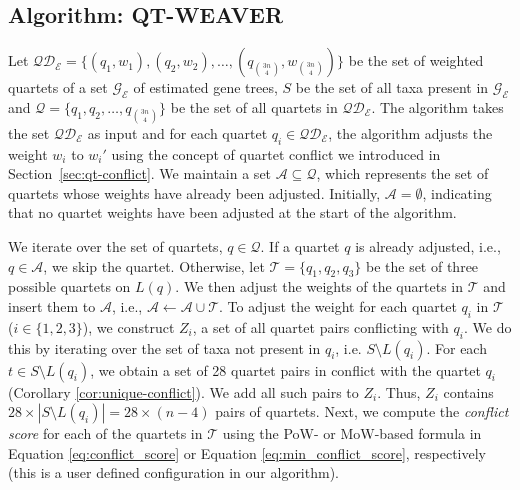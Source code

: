 \documentclass[10pt,a4paper]{article}
\newcommand{\addb}[1]{{\color{red} #1}}
\begin{document}
\subsection{Algorithm: QT-WEAVER}
\label{sec:qt-weaver-algorithm}

Let $\mathcal{QD_E} = \{ (q_1,w_1), (q_2,w_2), \ldots, (q_{3n \choose 4},w_{3n \choose 4}) \}$ be the set of weighted quartets of a set $\mathcal{G_E}$ of estimated gene trees, $S$ be the set of all taxa present in  $\mathcal{G_E}$ and $\mathcal{Q} = \{ q_1, q_2, \ldots,q_{3n \choose 4} \} $ be the set of all quartets in $\mathcal{QD_E}$. The algorithm takes the set $\mathcal{QD_E}$ as input and for each quartet $q_i \in \mathcal{QD_E}$, the algorithm adjusts the weight $w_i$ to $w_i'$ using the concept of quartet conflict we introduced in Section~\ref{sec:qt-conflict}. We maintain a set \( \mathcal{A} \subseteq \mathcal{Q} \), which represents the set of quartets whose weights have already been adjusted.  Initially, \( \mathcal{A} = \emptyset \), indicating that no quartet weights have been adjusted at the start of the algorithm.

We iterate over the set of quartets, $q \in \mathcal{Q}$. If a quartet $q$ is already adjusted, i.e., $ q \in \mathcal{A} $, we skip the quartet. Otherwise, let $ \mathcal{T} = \{q_1, q_2, q_3\}$ be the set of three possible quartets on $L(q)$. %
We then adjust the weights of the quartets in $\mathcal{T}$ and insert them to $\mathcal{A}$, i.e., $\mathcal{A} \leftarrow \mathcal{A} \cup \mathcal{T}$. To adjust the weight for each quartet $q_i$ in $\mathcal{T}$ ($i \in \{ 1,2,3\}$), we construct $Z_i$, a set of all quartet pairs conflicting with $q_i$. %
We do this by iterating over the set of taxa not present in $q_i$, i.e. $S \setminus L(q_i)$. 
For each $t \in S \setminus L(q_i)$, we obtain a set of 28 quartet pairs in conflict with the quartet $q_i$ (Corollary \ref{cor:unique-conflict}). We add all such pairs to $Z_i$. Thus, $Z_i$ contains $28\times|S \setminus L(q_i)| = 28 \times (n-4)$ pairs of quartets. Next, we compute the \textit{conflict score} for each of the quartets in $\mathcal{T}$ using the PoW- or MoW-based formula in Equation \eqref{eq:conflict_score} or Equation \eqref{eq:min_conflict_score}, respectively (this is a user defined configuration in our algorithm).
\end{document}
